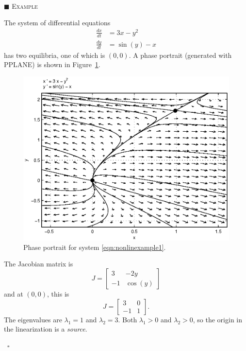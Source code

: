 \documentclass[reqno]{immbook}
\numberwithin{equation}{chapter}
\numberwithin{question}{section}
\numberwithin{theorem}{chapter}
\numberwithin{figure}{chapter}
\theoremstyle{definition}
\newenvironment{xexample}%
{%

\medskip\noindent\addtocounter{example}{1}$\blacksquare$ \textsc{Example \theexample}\hspace*{1em}%
}%
{%
~\hfill$\square$

\medskip
}
\begin{document}
\begin{xexample}
The system of differential equations
\begin{equation}
\begin{split}
   \frac{dx}{dt} & = 3x-y^2 \\
   \frac{dy}{dt} & = \sin(y)-x
\end{split}
\label{eqn:nonlinexample1}
\end{equation}
has two equilibria, one of which is  $(0,0)$.
A phase portrait (generated with PPLANE) is shown in
Figure~\ref{fig:nonlinexample1}.
\begin{figure}
\centerline{%
\includegraphics[width=5in]{pplane_plots/NonlinExample1.ps}
}
\caption{Phase portrait for system \eqref{eqn:nonlinexample1}.}
\label{fig:nonlinexample1}
\end{figure}
  The Jacobian matrix is
\begin{equation}
  J = \begin{bmatrix}
           3 &  -2y \\
	   -1 & \cos(y)
      \end{bmatrix}
\end{equation}
and at $(0,0)$, this is
\begin{equation}
  J = \begin{bmatrix}
           3 &  0 \\
	   -1 & 1
      \end{bmatrix}.
\end{equation}
The eigenvalues are $\lambda_1=1$ and $\lambda_2=3$.
Both $\lambda_1>0$ and $\lambda_2>0$, so the origin
in the linearization is a \emph{source}.

\end{xexample}
\end{document}
